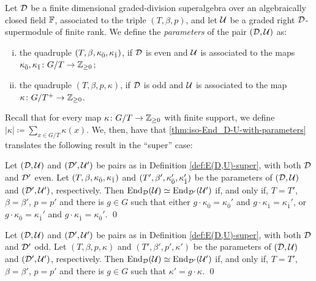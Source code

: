 \begin{defi}\label{def:E(D,U)-super}
    Let $\mathcal{D}$ be a finite dimensional graded-division superalgebra over an algebraically closed field $\mathbb{F}$, associated to the triple $(T, \beta, p)$, and let $\mathcal U$ be a graded right $\mathcal{D}$-supermodule of finite rank. 
    We define the \emph{parameters} of the pair $(\mathcal{D}, \mathcal U)$ as:
    \begin{enumerate}[(i)]
        \item the quadruple $(T, \beta, \kappa_{\bar{0}}, \kappa_{\bar{1}})$, if $\mathcal{D}$ is even and $\mathcal U$ is associated to the maps $\kappa_{\bar{0}}, \kappa_{\bar{1}} \colon G/T \to \mathbb{Z}_{\geq 0}$;
        \item the quadruple $(T, \beta, p, \kappa)$, if $\mathcal{D}$ is odd and $\mathcal U$ is associated to the map $\kappa\colon G/T^+ \to \mathbb{Z}_{\geq 0}$.
    \end{enumerate}
\end{defi}

Recall that for every map $\kappa\colon G/T\to \mathbb{Z}_{\geq 0}$ with finite support, we define $|\kappa| \coloneqq \sum_{x \in G/T} \kappa(x)$. 
We, then, have that  \cref{thm:iso-End_D-U-with-parameters} translates the following result in the ``super'' case:

\begin{thm}\label{thm:iso-D-even}
	Let $(\mathcal{D}, \mathcal U)$ and $(\mathcal{D}', \mathcal U')$ be pairs as in Definition \ref{def:E(D,U)-super}, with both $\mathcal{D}$ and $\mathcal{D}'$ even. 
	Let $(T, \beta, \kappa_{\bar{0}}, \kappa_{\bar{1}})$ and $(T', \beta', \kappa_{\bar{0}}', \kappa_{\bar{1}}')$ be the parameters of $(\mathcal{D}, \mathcal U)$ and $(\mathcal{D}', \mathcal U')$, respectively. 
	Then $\operatorname{End}_{\mathcal{D}} (\mathcal U) \simeq \operatorname{End}_{\mathcal{D}'} (\mathcal U')$ if, and only if, $T=T'$, $\beta=\beta'$, $p = p'$ and there is $g\in G$ such that either $g \cdot \kappa_{\bar 0}=\kappa_{\bar 0}'$ and $g \cdot \kappa_{\bar 1}=\kappa_{\bar 1}'$, or $g \cdot \kappa_{\bar 0}=\kappa_{\bar 1}'$ and $g \cdot \kappa_{\bar 1}=\kappa_{\bar 0}'$. \qed
\end{thm}

\begin{thm}\label{thm:iso-D-odd}
    Let $(\mathcal{D}, \mathcal U)$ and $(\mathcal{D}', \mathcal U')$ be pairs as in Definition \ref{def:E(D,U)-super}, with both $\mathcal{D}$ and $\mathcal{D}'$ odd. 
    Let $(T, \beta, p, \kappa)$ and $(T', \beta', p', \kappa')$ be the parameters of $(\mathcal{D}, \mathcal U)$ and $(\mathcal{D}', \mathcal U')$, respectively. 
	Then $\operatorname{End}_{\mathcal{D}} (\mathcal U) \simeq \operatorname{End}_{\mathcal{D}'} (\mathcal U')$ if, and only if, $T=T'$, $\beta=\beta'$, $p = p'$ and there is $g\in G$ such that $\kappa' = g \cdot \kappa$. \qed
\end{thm}

